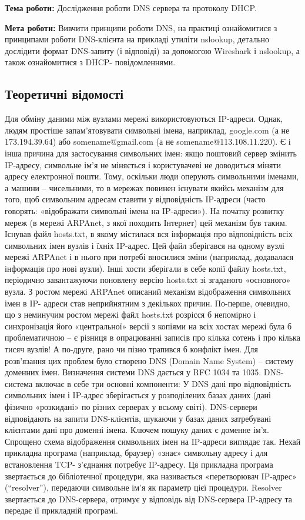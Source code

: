 \documentclass[12pt]{extarticle}
\begin{document}
\textbf{Тема роботи:} Дослідження роботи DNS сервера та протоколу DHCP.
\vspace{12pt}

\textbf{Мета роботи:} Вивчити принципи роботи DNS, на практиці ознайомитися з принципами роботи
DNS-клієнта на прикладі утиліти nslookup, детально дослідити формат DNS-запиту (і
відповіді) за допомогою Wireshark і nslookup, а також ознайомитися з DHCP-
повідомленнями.
\subsection*{Теоретичні відомості}
Для обміну даними між вузлами мережі використовуються IP-адреси. Однак, людям
простіше запам’ятовувати символьні імена, наприклад, google.com (а не 173.194.39.64) або
somename@gmail.com (а не somename@113.108.11.220). Є і інша причина для застосування
символьних імен: якщо поштовий сервер змінить IP-адресу, символьне ім’я не міняється і
користувачеві не доводиться міняти адресу електронної пошти. Тому, оскільки люди
оперують символьними іменами, а машини – чисельними, то в мережах повинен існувати
якийсь механізм для того, щоб символьним адресам ставити у відповідність IP-адреси (часто
говорять: «відображати символьні імена на IP-адреси»).
На початку розвитку мереж (в мережі ARPAnet, з якої походить Інтернет) цей
механізм був таким. Існував файл hosts.txt, в якому містилася вся інформація про
відповідність всіх символьних імен вузлів і їхніх IP-адрес. Цей файл зберігався на одному
вузлі мережі ARPAnet і в нього при потребі вносилися зміни (наприклад, додавалася
інформація про нові вузли). Інші хости зберігали в себе копії файлу hosts.txt, періодично
завантажуючи поновлену версію hosts.txt зі згаданого «основного» вузла.
З ростом мережі ARPAnet описаний механізм відображення символьних імен в IP-
адреси став неприйнятним з декількох причин. По-перше, очевидно, що з неминучим ростом
мережі файл hosts.txt розрісся б непомірно і синхронізація його «центральної» версії з
копіями на всіх хостах мережі була б проблематичною – є різниця в опрацюванні записів про
кілька сотень і про кілька тисяч вузлів! А по-друге, рано чи пізно трапився б конфлікт імен.
Для розв’язання цих проблем було створено DNS (Domain Name System) – систему
доменних імен. Визначення системи DNS дається у RFC 1034 та 1035.
DNS-система включає в себе три основні компоненти:
У DNS дані про відповідність символьних імен і IP-адрес зберігається у розподілених
базах даних (дані фізично «розкидані» по різних серверах у всьому світі). DNS-сервери
відповідають на запити DNS-клієнтів, шукаючи у базах даних затребувані клієнтами дані про
доменні імена. Ключем пошуку даних є доменне ім’я.
Спрощено схема відображення символьних імен на IP-адреси виглядає так. Нехай
прикладна програма (наприклад, браузер) «знає» символьну адресу і для встановлення TCP-
з'єднання потребує IP-адресу. Ця прикладна програма звертається до бібліотечної процедури,
яка називається «перетворювач IP-адрес» (“resolver”), передаючи символьне ім’я як параметр
цієї процедури. Resolver звертається до DNS-сервера, отримує у відповідь від DNS-сервера
IP-адресу та передає її прикладній програмі.
\break
\end{document}
